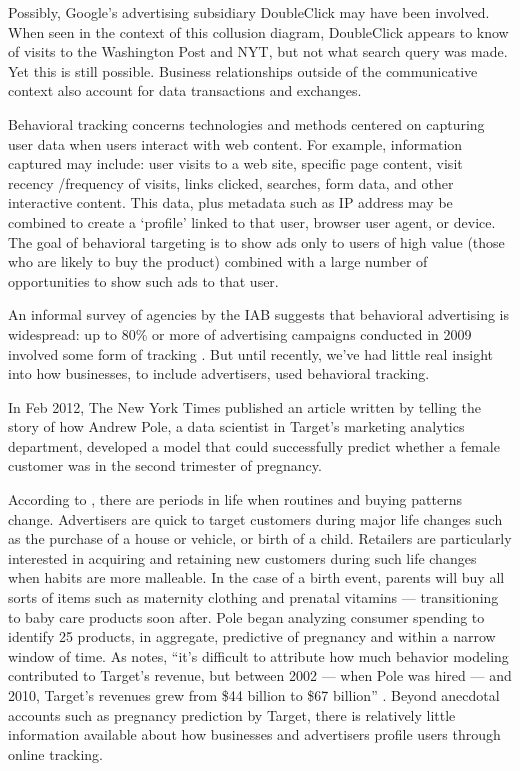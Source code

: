 Possibly, Google's advertising subsidiary DoubleClick may have been involved. When seen in the context of this collusion diagram, DoubleClick appears to know of visits to the Washington Post and NYT, but not what search query was made. Yet this is still possible. Business relationships outside of the communicative context also account for data transactions and exchanges.

Behavioral tracking concerns technologies and methods centered on capturing user data when users interact with web content. For example, information captured may include: user visits to a web site, specific page content, visit recency \slash  frequency of visits, links clicked, searches, form data, and other interactive content. This data, plus metadata such as IP address may be combined to create a `profile' linked to that user, browser user agent, or device. The goal of behavioral targeting is to show ads only to users of high value (those who are likely to buy the product) combined with a large number of opportunities to show such ads to that user.

An informal survey of agencies by the IAB suggests that behavioral advertising is widespread: up to 80\% or more of advertising campaigns conducted in 2009 involved some form of tracking  \citep{IAB:2010wz}.  But until recently, we've had little real insight into how businesses, to include advertisers, used behavioral tracking.

In Feb 2012, The New York Times published an article written by  \cite{Duhigg:2012ua}  telling the story of how Andrew Pole, a data scientist in Target's marketing analytics department, developed a model that could successfully predict whether a female customer was in the second trimester of pregnancy.

According to  \cite{Duhigg:2012ua},  there are periods in life when routines and buying patterns change. Advertisers are quick to target customers during major life changes such as the purchase of a house or vehicle, or birth of a child. Retailers are particularly interested in acquiring and retaining new customers during such life changes when habits are more malleable. In the case of a birth event, parents will buy all sorts of items such as maternity clothing and prenatal vitamins --- transitioning to baby care products soon after. Pole began analyzing consumer spending to identify 25 products, in aggregate, predictive of pregnancy and within a narrow window of time. As  \cite{Duhigg:2012ua}  notes, ``it's difficult to attribute how much behavior modeling contributed to Target's revenue, but between 2002 --- when Pole was hired --- and 2010, Target's revenues grew from \$44 billion to \$67 billion''  \citep{Duhigg:2012ua}.  Beyond anecdotal accounts such as pregnancy prediction by Target, there is relatively little information available about how businesses and advertisers profile users through online tracking. 

